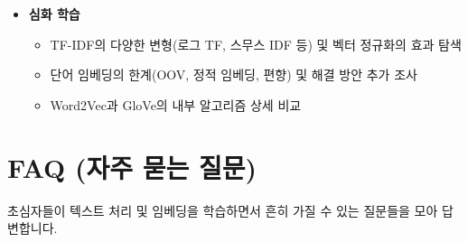 \documentclass[11pt,a4paper]{article}
\theoremstyle{definition}
\newcommand{\newsection}[1]{\newpage\section{#1}}
\begin{document}
\begin{itemize}
\begin{itemize}
        \item [ ] 과제에서 요구하는 TF-IDF 및 임베딩 적용 방식 확인 (예: 10,000개 단어 사용)
        \item [ ] 90\% 정확도 달성 목표 확인 (지난 과제보다 쉬울 수 있음)
    \end{itemize}
    \item \textbf{심화 학습}
    \begin{itemize}
        \item [ ] TF-IDF의 다양한 변형(로그 TF, 스무스 IDF 등) 및 벡터 정규화의 효과 탐색
        \item [ ] 단어 임베딩의 한계(OOV, 정적 임베딩, 편향) 및 해결 방안 추가 조사
        \item [ ] Word2Vec과 GloVe의 내부 알고리즘 상세 비교
    \end{itemize}
\end{itemize}

\newsection{FAQ (자주 묻는 질문)}

\begin{tcolorbox}[infobox, title=💡 FAQ: 초심자를 위한 질문과 답변]
초심자들이 텍스트 처리 및 임베딩을 학습하면서 흔히 가질 수 있는 질문들을 모아 답변합니다.
\end{tcolorbox}
\end{document}
